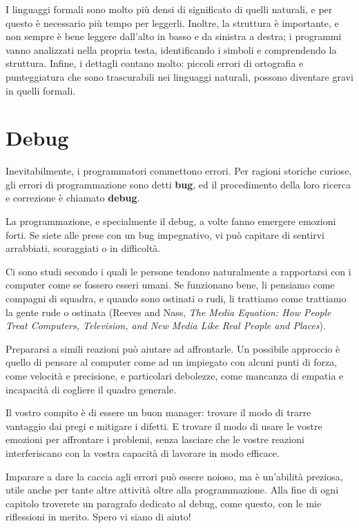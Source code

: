 \documentclass[10pt]{book}
\begin{document}
I linguaggi formali sono molto più densi di significato di quelli naturali, e per questo è necessario più tempo per leggerli. Inoltre, la struttura è importante, e non sempre è bene leggere dall'alto in basso e da sinistra a destra; i programmi vanno analizzati nella propria testa, identificando i simboli e comprendendo la struttura. Infine, i dettagli contano molto: piccoli errori di ortografia e punteggiatura che sono trascurabili nei linguaggi naturali, possono diventare gravi in quelli formali.

\section{Debug}

Inevitabilmente, i programmatori commettono errori. Per ragioni storiche curiose, gli errori di programmazione sono detti {\bf bug}, ed il procedimento della loro ricerca e correzione è chiamato {\bf debug}.

La programmazione, e specialmente il debug, a volte fanno emergere emozioni forti. Se siete alle prese con un bug impegnativo, vi può capitare di sentirvi arrabbiati, scoraggiati o in difficoltà.

Ci sono studi secondo i quali le persone tendono naturalmente a rapportarsi con i computer come se fossero esseri umani. Se funzionano bene, li pensiamo come compagni di squadra, e quando sono ostinati o rudi, li trattiamo come trattiamo la gente rude o ostinata (Reeves and Nass, {\it The Media Equation: How People Treat Computers, Television, and New Media Like Real People and Places}).

Prepararsi a simili reazioni può aiutare ad affrontarle. Un possibile approccio è quello di pensare al computer come ad un impiegato con alcuni punti di forza, come velocità e precisione, e particolari debolezze, come mancanza di empatia e incapacità di cogliere il quadro generale.

Il vostro compito è di essere un buon manager: trovare il modo di trarre vantaggio dai pregi e mitigare i difetti. E trovare il modo di usare le vostre emozioni per affrontare i problemi, senza lasciare che le vostre reazioni interferiscano con la vostra capacità di lavorare in modo efficace.

Imparare a dare la caccia agli errori può essere noioso, ma è un'abilità preziosa, utile anche per tante altre attività oltre alla programmazione. Alla fine di ogni capitolo troverete un paragrafo dedicato al debug, come questo, con le mie riflessioni in merito. Spero vi siano di aiuto!
\end{document}
